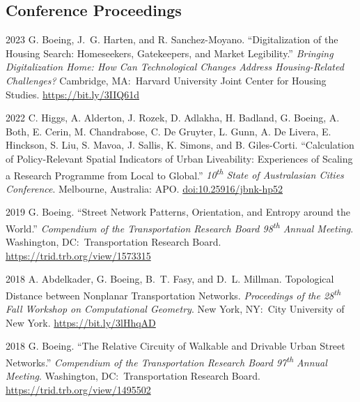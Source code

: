 \documentclass[11pt,letterpaper]{report} %
\begin{document}
    \subsection*{Conference Proceedings}

    \begin{tablist}

        \item[2023] \tab{}G. Boeing, J.~G. Harten, and R. Sanchez-Moyano. \enquote{Digitalization of the Housing Search: Homeseekers, Gatekeepers, and Market Legibility.} \textit{Bringing Digitalization Home: How Can Technological Changes Address Housing-Related Challenges?} Cambridge, MA:\ Harvard University Joint Center for Housing Studies. \href{https://bit.ly/3IIQ61d}{https://bit.ly/3IIQ61d}

        \item[2022] \tab{}C. Higgs, A. Alderton, J. Rozek, D. Adlakha, H. Badland, G. Boeing, A. Both, E. Cerin, M. Chandrabose, C. De Gruyter, L. Gunn, A. De Livera, E. Hinckson, S. Liu, S. Mavoa, J. Sallis, K. Simons, and B. Giles-Corti. \enquote{Calculation of Policy-Relevant Spatial Indicators of Urban Liveability: Experiences of Scaling a Research Programme from Local to Global.} \textit{10\textsuperscript{th} State of Australasian Cities Conference}. Melbourne, Australia: APO\@. \href{https://doi.org/10.25916/jbnk-hp52}{doi:10.25916/jbnk-hp52}

        \item[2019] \tab{}G. Boeing. \enquote{Street Network Patterns, Orientation, and Entropy around the World.} \textit{Compendium of the Transportation Research Board 98\textsuperscript{th} Annual Meeting}. Washington, DC:\ Transportation Research Board. \href{https://trid.trb.org/view/1573315}{https://trid.trb.org/view/1573315}

        \item[2018] \tab{}A. Abdelkader, G. Boeing, B.~T. Fasy, and D.~L. Millman. Topological Distance between Nonplanar Transportation Networks. \textit{Proceedings of the 28\textsuperscript{th} Fall Workshop on Computational Geometry}. New York, NY:\ City University of New York. \href{https://bit.ly/3lHhqAD}{https://bit.ly/3lHhqAD}

        \item[2018] \tab{}G. Boeing. \enquote{The Relative Circuity of Walkable and Drivable Urban Street Networks.} \textit{Compendium of the Transportation Research Board 97\textsuperscript{th} Annual Meeting}. Washington, DC:\ Transportation Research Board. \href{https://trid.trb.org/view/1495502}{https://trid.trb.org/view/1495502}

    \end{tablist}
\end{document}
